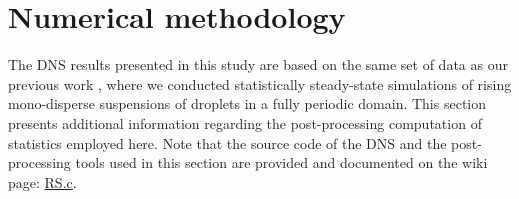 \section{Numerical methodology}
\label{sec:methodo2}

The DNS results presented in this study are based on the same set of data as our previous work \citet{fintzi2024buoyancy}, where we conducted statistically steady-state simulations of rising mono-disperse suspensions of droplets in a fully periodic domain. 
This section 
presents additional information regarding the post-processing computation of statistics employed here. 
Note that the source code of the DNS and the post-processing tools used in this section are provided and documented on the wiki page: \href{http://basilisk.fr/sandbox/fintzin/Rising-suspension/RS.c}{RS.c}. 






